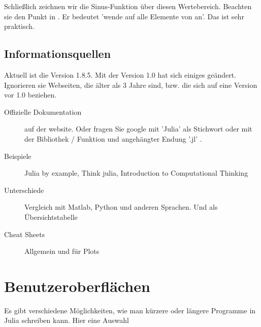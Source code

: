Schließlich zeichnen wir die Sinus-Funktion über diesen Wertebereich. Beachten sie den Punkt in . Er bedeutet 'wende  auf alle Elemente von  an'. Das ist sehr praktisch.


\subsection{Informationsquellen}

Aktuell ist die Version 1.8.5. Mit der Version 1.0 hat sich einiges geändert. Ignorieren sie Webseiten, die älter als 3 Jahre sind, bzw. die sich auf eine Version vor 1.0 beziehen.

\begin{description}

\item[Offizielle Dokumentation] auf der website. Oder fragen Sie google mit 'Julia' als Stichwort oder mit der Bibliothek / Funktion und angehängter Endung '.jl' .

\item[Beispiele] Julia by example, Think julia, Introduction to Computational Thinking

\item[Unterschiede] Vergleich  mit  Matlab,  Python und anderen Sprachen. Und als Übersichtstabelle

\item[Cheat Sheets] Allgemein und für Plots 

\end{description}



\section{Benutzeroberflächen}


Es gibt verschiedene Möglichkeiten, wie man kürzere oder längere Programme in Julia schreiben kann. Hier eine Auswahl

